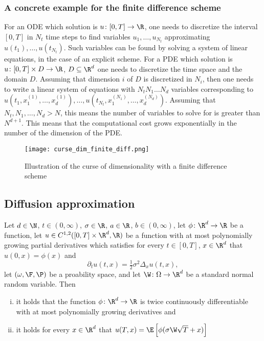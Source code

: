 \subsubsection*{A concrete example for the finite difference scheme}
For an ODE which solution is $u \colon [0,T] \to \R$, one needs to discretize the interval $[0,T]$ in $N_t$ time steps to find variables $u_1, \dots, u_{N_t}$ approximating $u(t_1), \dots, u(t_{N_t})$. Such variables can be found by solving a system of linear equations, in the case of an explicit scheme. For a PDE which solution is $u \colon [0,T] \times D \to \R$, $D\subseteq \R^d$ one needs to discretize the time space and the domain $D$. Assuming that dimension $i$ of $D$ is discretized in $N_i$, then one needs to write a linear system of equations with $N_t N_1 \dots N_d$ variables corresponding to $u(t_1, x_1^{(1)}, \dots, x_d^{(1)}), \dots, u(t_{N_t}, x_1^{(N_1)}, \dots, x_d^{(N_d)})$. Assuming that $N_t, N_1, \dots, N_d > N$, this means the number of variables to solve for is  greater than $N^{d+1}$. This means that the computational cost grows exponentially in the number of the dimension of the PDE.

\begin{figure}
    \center
    \texttt{[image: curse\_dim\_finite\_diff.png]}
    \caption{Illustration of the curse of dimensionality with a finite difference scheme}
\end{figure}

\subsection*{Diffusion approximation}
\begin{proposition}
    Let $d \in \N$, 
    $t \in (0, \infty)$, 
    $\sigma \in \R$,
    $a \in \R$,
    $b \in (0, \infty)$, 
    let 
    $\phi \colon \R^d \to \R$ 
    be a function,
    let 
    $u \in C^{1,2}([0,T] \times \R^d, \R)$ 
    be a function with at most polynomially growing partial derivatives which satisfies for every 
    $t\in [0,T]$,
    $x \in \R^d$ 
    that
    $u(0, x) = \phi(x)$ 
    and
    \begin{equation}
        \partial_t u(t, x) = \tfrac{1}{2} \sigma^2 \Delta_x u(t,x),
    \end{equation}
    let $(\omega, \F, \P)$ be a proability space, and let $\W \colon \Omega\to\R^d$ be a standard normal random variable.
    Then
    \begin{enumerate}[(i)]
        \item it holds that the function $\phi \colon \R^d \to \R$ is twice continuously differentiable with at most polynomially growing derivatives and 
        \item it holds for every $x \in \R^d$ that $u(T, x) = \E\left[ \phi(\sigma \W \sqrt{T} + x)\right]$
    \end{enumerate} 
\end{proposition}

